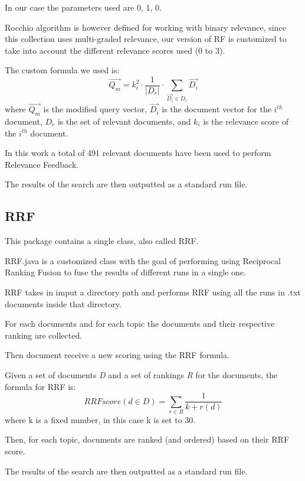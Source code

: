         In our case the parameters used are 0, 1, 0.
        
        Rocchio algorithm is however defined for working with binary relevance, since this collection uses multi-graded relevance, our version of RF is customized to take into account the different relevance scores used (0 to 3).
        
        The custom formula we used is:
        $$
        \overrightarrow{Q_{m}}=
        k_i^2\cdot\frac{1}{|D_{r}|}\cdot\sum_{\overrightarrow{D_{i}}\in D_{r}}\overrightarrow{D_{i}}
        $$
        where $\overrightarrow{Q_{m}}$ is the modified query vector, $\overrightarrow{D_{i}}$ is the document vector for the $i^{th}$ document, $D_{r}$ is the set of relevant documents, and $k_i$ is the relevance score of the $i^{th}$ document.
         
         In this work a total of 491 relevant documents have been used to perform Relevance Feedback.
         
        The results of the search are then outputted as a standard run file.
        
\subsection{RRF}
  
      This package contains a single class, also called RRF.
        
        RRF.java is a customized class with the goal of performing using Reciprocal Ranking Fusion \citep{RRF} to fuse the results of different runs in a single one.
        
        RRF takes in imput a directory path and performs RRF using all the runs in .txt documents inside that directory.
        
        For each documents and for each topic the documents and their respective ranking are collected.
        
        Then document receive a new scoring using the RRF formula.
        
        Given a set of documents \textit{D} and a set of rankings \textit{R} for the documents, the formula for RRF is:
        $$RRFscore(d \in D)=\sum_{r \in R}^{}\frac{1}{k+r(d)}$$
        where k is a fixed number, in this case k is set to 30.
        
        Then, for each topic, documents are ranked (and ordered) based on their RRF score.
        
        The results of the search are then outputted as a standard run file.

